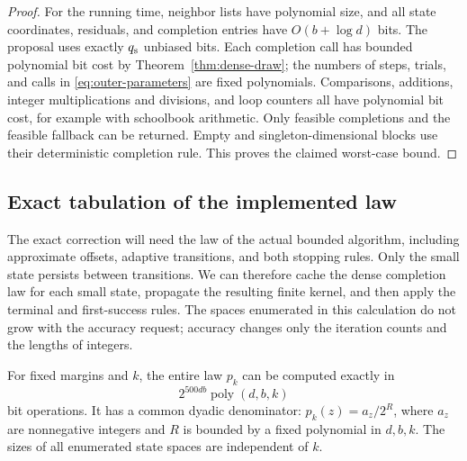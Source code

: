 \begin{proof}
For the running time, neighbor lists have polynomial size, and all state
coordinates, residuals, and completion entries have $O(b+\log d)$ bits.
The proposal uses exactly $q_{\rm s}$ unbiased bits. Each completion call
has bounded polynomial bit cost by Theorem~\ref{thm:dense-draw}; the numbers
of steps, trials, and calls in \eqref{eq:outer-parameters} are fixed
polynomials. Comparisons, additions, integer multiplications and divisions,
and loop counters all have polynomial bit cost, for example with schoolbook
arithmetic. Only feasible completions and the feasible fallback can be
returned. Empty and singleton-dimensional blocks use their deterministic
completion rule. This proves the claimed worst-case bound.
\end{proof}

\subsection{Exact tabulation of the implemented law}

The exact correction will need the law of the actual bounded algorithm,
including approximate offsets, adaptive transitions, and both stopping
rules. Only the small state persists between transitions. We can therefore
cache the dense completion law for each small state, propagate the resulting
finite kernel, and then apply the terminal and first-success rules. The spaces
enumerated in this calculation do not grow with the accuracy request;
accuracy changes only the iteration counts and the lengths of integers.

\begin{proposition}\label{prop:law-tabulation}
For fixed margins and $k$, the entire law $p_k$ can be computed exactly in
\[
 2^{500db}\operatorname{poly}(d,b,k)
\]
bit operations. It has a common dyadic denominator:
$p_k(z)=a_z/2^R$, where $a_z$ are nonnegative integers and $R$ is bounded by
a fixed polynomial in $d,b,k$. The sizes of all enumerated state spaces
are independent of $k$.
\end{proposition}

